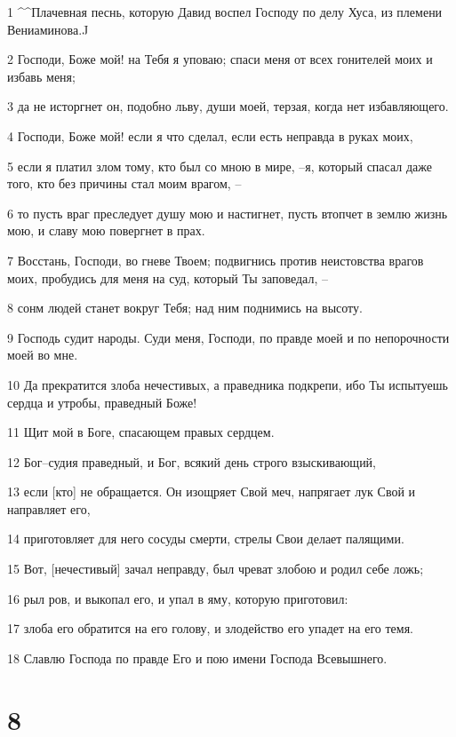 \par 1 ^^Плачевная песнь, которую Давид воспел Господу по делу Хуса, из племени Вениаминова.^^
\par 2 Господи, Боже мой! на Тебя я уповаю; спаси меня от всех гонителей моих и избавь меня;
\par 3 да не исторгнет он, подобно льву, души моей, терзая, когда нет избавляющего.
\par 4 Господи, Боже мой! если я что сделал, если есть неправда в руках моих,
\par 5 если я платил злом тому, кто был со мною в мире, --я, который спасал даже того, кто без причины стал моим врагом, --
\par 6 то пусть враг преследует душу мою и настигнет, пусть втопчет в землю жизнь мою, и славу мою повергнет в прах.
\par 7 Восстань, Господи, во гневе Твоем; подвигнись против неистовства врагов моих, пробудись для меня на суд, который Ты заповедал, --
\par 8 сонм людей станет вокруг Тебя; над ним поднимись на высоту.
\par 9 Господь судит народы. Суди меня, Господи, по правде моей и по непорочности моей во мне.
\par 10 Да прекратится злоба нечестивых, а праведника подкрепи, ибо Ты испытуешь сердца и утробы, праведный Боже!
\par 11 Щит мой в Боге, спасающем правых сердцем.
\par 12 Бог--судия праведный, и Бог, всякий день строго взыскивающий,
\par 13 если [кто] не обращается. Он изощряет Свой меч, напрягает лук Свой и направляет его,
\par 14 приготовляет для него сосуды смерти, стрелы Свои делает палящими.
\par 15 Вот, [нечестивый] зачал неправду, был чреват злобою и родил себе ложь;
\par 16 рыл ров, и выкопал его, и упал в яму, которую приготовил:
\par 17 злоба его обратится на его голову, и злодейство его упадет на его темя.
\par 18 Славлю Господа по правде Его и пою имени Господа Всевышнего.

\chapter{8}

